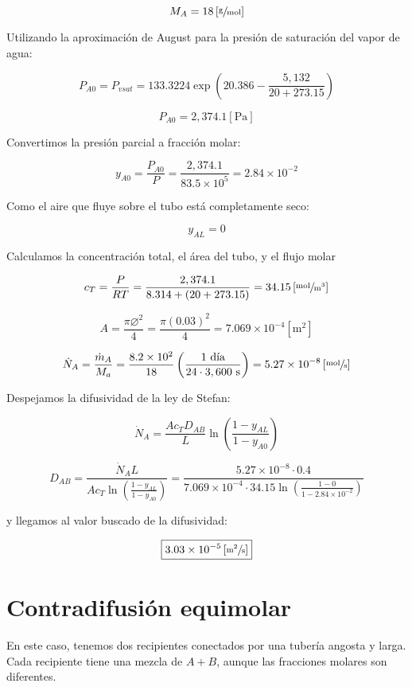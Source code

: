 \documentclass[11pt]{article}
\begin{document}
\[ M_A = 18 \left[ \sfrac{\text{g}}{\text{mol}} \right] \]

Utilizando la aproximación de August para la presión de saturación del vapor de agua:

\[ P_{A0} = P_{vsat} = 133.3224 \exp \left( 20.386 - \frac{5,132}{20 + 273.15} \right) \]

\[ P_{A0} = 2,374.1 \left[ \text{Pa} \right] \]

Convertimos la presión parcial a fracción molar:

\[ y_{A0} = \frac{P_{A0}}{P} = \frac{2,374.1}{83.5 \times 10^5} = 2.84 \times 10^{-2} \]

Como el aire que fluye sobre el tubo está completamente seco:

\[ y_{AL} = 0 \]

Calculamos la concentración total, el área del tubo, y el flujo molar

\[ c_T = \frac{P}{RT} = \frac{2,374.1}{ 8.314 + \left( 20 + 273.15 \right) } = 34.15 \left[ \sfrac{\text{mol}}{\text{m}^3} \right] \]

\[ A = \frac{ \pi \diameter ^2 }{ 4 } = \frac{ \pi \left( 0.03 \right) ^2 }{ 4 } = 7.069 \times 10^{-4} \left[ \text{m} ^2 \right] \]

\[ {\dot N}_A = \frac{{\dot m}_A}{M_a} = \frac{8.2 \times 10^2}{18} \left( \frac{1 \ \text{día}}{24 \cdot 3,600 \ \text{s}} \right) = 5.27 \times 10^{-8} \left[ \sfrac{\text{mol}}{\text{s}} \right] \]

Despejamos la difusividad de la ley de Stefan:

\[ {\dot N}_A = \frac{ A c_T D_{AB} }{ L } \ln \left( \frac{ 1 - y_{AL} }{ 1 - y_{A0} } \right) \]

\[D_{AB} = \frac{ {\dot N}_A L }{ A c_T \ln \left( \frac{ 1 - y_{AL} }{ 1 - y_{A0} } \right) } = \frac{ 5.27 \times 10^{-8} \cdot 0.4 }{ 7.069 \times 10^{-4} \cdot 34.15 \ln \left( \frac{ 1 - 0 }{ 1 - 2.84 \times 10^{-2} } \right) } \]

y llegamos al valor buscado de la difusividad:

\[ \boxed{ 3.03 \times 10^{-5} \left[ \sfrac{\text{m}^2}{\text{s}} \right] } \]

\section{Contradifusión equimolar}

En este caso, tenemos dos recipientes conectados por una tubería angosta y larga. Cada recipiente tiene una mezcla de \( A + B \), aunque las fracciones molares son diferentes.
\end{document}
